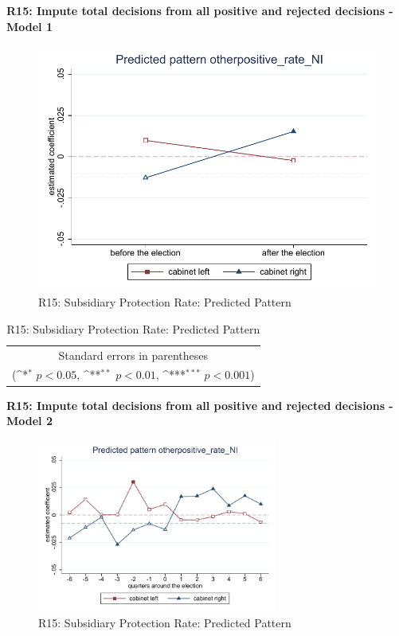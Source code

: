 \documentclass[10pt,a4paper]{scrartcl}
\begin{document}
\clearpage
\textbf{R15: Impute total decisions from all positive and rejected decisions - Model 1}
\begin{figure}[!ht]
	\centering
	\includegraphics[width=1\textwidth]{figures_edited/otherpositive_rate_NI_graph1_R15.pdf}
	\caption{R15: Subsidiary Protection Rate: Predicted Pattern}
\end{figure}

\begin{table}[!ht]\centering
	\renewcommand{\arraystretch}{1.25}
	\def\sym#1{\ifmmode^{#1}\else\(^{#1}\)\fi}
	\caption{R15: Subsidiary Protection Rate: Predicted Pattern}
	\begin{tabular}{l*{2}{c}}
		\hline\hline
		
		\hline\hline
		\multicolumn{3}{c}{\footnotesize Standard errors in parentheses} \\
		\multicolumn{3}{c}{\footnotesize (\sym{*} \(p<0.05\), \sym{**} \(p<0.01\), \sym{***} \(p<0.001\))}\\
	\end{tabular}
\end{table}

\clearpage
\textbf{R15: Impute total decisions from all positive and rejected decisions - Model 2}
\begin{figure}[!ht]
	\centering
	\includegraphics[width=0.7\textwidth]{figures_edited/otherpositive_rate_NI_graph2_R15.pdf}
	\caption{R15: Subsidiary Protection Rate: Predicted Pattern}
\end{figure}
\end{document}
